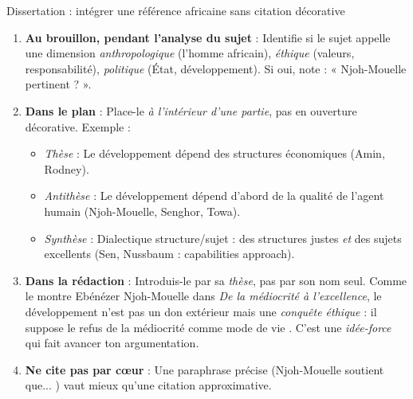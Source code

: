 \documentclass[11pt]{article}
\newcommand{\cle}[1]{{\popxbold\color{popdark}#1}}
\begin{document}
\begin{methode}{Dissertation : intégrer une référence africaine sans citation décorative}
\begin{enumerate}
    \item \textbf{Au brouillon, pendant l'analyse du sujet} : Identifie si le sujet appelle une dimension \emph{anthropologique} (l'homme africain), \emph{éthique} (valeurs, responsabilité), \emph{politique} (État, développement). Si oui, note : « Njoh-Mouelle pertinent ? ».
    \item \textbf{Dans le plan} : Place-le \emph{à l'intérieur d'une partie}, pas en ouverture décorative. Exemple : 
    \begin{itemize}
        \item \emph{Thèse} : Le développement dépend des structures économiques (Amin, Rodney).
        \item \emph{Antithèse} : Le développement dépend d'abord de la qualité de l'agent humain (Njoh-Mouelle, Senghor, Towa).
        \item \emph{Synthèse} : Dialectique structure/sujet : des structures justes \emph{et} des sujets excellents (Sen, Nussbaum : \cle{capabilities approach}).
    \end{itemize}
    \item \textbf{Dans la rédaction} : Introduis-le par sa \emph{thèse}, pas par son nom seul. \guillemotleft Comme le montre Ebénézer Njoh-Mouelle dans \emph{De la médiocrité à l'excellence}, le développement n'est pas un don extérieur mais une \emph{conquête éthique} : il suppose le refus de la médiocrité comme mode de vie \guillemotright. C'est une \emph{idée-force} qui fait avancer ton argumentation.
    \item \textbf{Ne cite pas par cœur} : Une paraphrase précise (\guillemotleft Njoh-Mouelle soutient que... \guillemotright) vaut mieux qu'une citation approximative.
\end{enumerate}
\end{methode}
\end{document}
